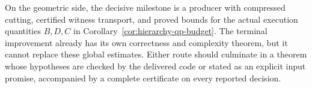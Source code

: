 On the geometric side, the decisive milestone is a producer with
compressed cutting, certified witness transport, and proved bounds for
the actual execution quantities $B,D,C$ in
Corollary~\ref{cor:hierarchy-qp-budget}.  The terminal improvement already
has its own correctness and complexity theorem, but it cannot replace
these global estimates.  Either route should culminate in a theorem
whose hypotheses are checked by the delivered code or stated as an
explicit input promise, accompanied by a complete certificate on every
reported decision.
